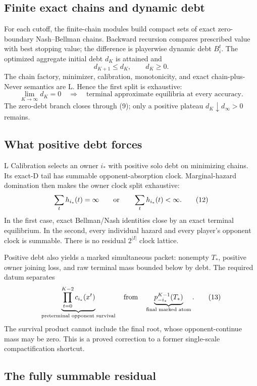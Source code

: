 \documentclass[11pt]{article}
\newcommand{\LTag}{\textsf{L}}
\newcommand{\Prod}{\LTag}
\newcommand{\Status}[1]{#1}
\begin{document}
\subsection{Finite exact chains and dynamic debt}

For each cutoff, the finite-chain modules build compact sets of exact
zero-boundary Nash--Bellman chains.  Backward recursion compares prescribed
value with best stopping value; the difference is playerwise dynamic debt
\(B_i^t\).  The optimized aggregate initial debt \(d_K\) is attained and
\[
 d_{K+1}\leq d_K,\qquad d_K\geq0.
\tag{10}
\]
The chain factory, minimizer, calibration, monotonicity, and exact
chain-plus-Never semantics are \Status{\Prod}.  Hence the first split is
exhaustive:
\[
 \lim_{K\to\infty}d_K=0
\quad\Longrightarrow\quad
\text{terminal approximate equilibria at every accuracy}.
\tag{11}
\]
The zero-debt branch closes through (9); only a positive plateau
\(d_K\downarrow d_\infty>0\) remains.

\subsection{What positive debt forces}

\Status{\Prod} Calibration selects an owner \(i_*\) with positive solo debt
on minimizing chains.  Its exact-D tail has summable opponent-absorption
clock.  Marginal-hazard domination then makes the owner clock split exhaustive:
\[
 \sum_t h_{i_*}(t)=\infty\qquad\hbox{or}\qquad
 \sum_t h_{i_*}(t)<\infty.
\tag{12}
\]
In the first case, exact Bellman/Nash identities close by an exact terminal
equilibrium.  In the second, every individual hazard and every player's
opponent clock is summable.  There is no residual \(2^{|I|}\) clock lattice.

Positive debt also yields a marked simultaneous packet: nonempty
\(T_*\), positive owner joining loss, and raw terminal mass bounded below by
debt.  The required datum separates
\[
 \underbrace{\prod_{t=0}^{K-2}c_{i_*}(x^t)}
 _{\text{preterminal opponent survival}}
\quad\hbox{from}\quad
 \underbrace{p_{-i_*}^{K-1}(T_*)}_{\text{final marked atom}}.
\tag{13}
\]
The survival product cannot include the final root, whose opponent-continue
mass may be zero.  This is a proved correction to a former single-scale
compactification shortcut.

\subsection{The fully summable residual}
\end{document}
